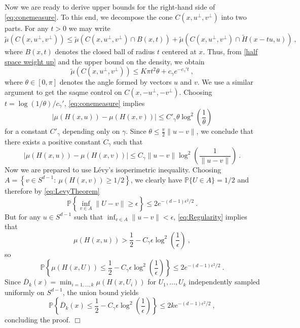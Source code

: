 \documentclass[12pt]{article}
\newcommand{\PP}{\mathbb{P}}
\newcommand{\wt}{\widetilde}
\newcommand{\ol}{\overline}
\newcommand{\field}[1]{\mathbb{#1}}
\newcommand{\PROB}{\field{P}}
\newcommand{\qed}{\hfill $\Box$}
\newenvironment{proof}{\par\noindent{\bf Proof:}}{\qed \par\medskip\noindent}
\begin{document}
\begin{proof}
Now we are ready to derive upper bounds for the right-hand side of \eqref{eq:conemeasure}.
To this end, we decompose the cone $C(x,u^{\perp},v^{\perp})$ into two
parts. For any $t>0$ we may write
\[
 \wt{\mu} \left(C(x,u^{\perp},v^{\perp})\right)
 \le \wt{\mu} \left(C(x,u^{\perp},v^{\perp}) \cap B(x,t)\right)
 + \wt{\mu} \left(C(x,u^{\perp},v^{\perp}) \cap \wt{H}(x-t u,u) \right)~,
\]
where $B(x,t)$ denotes the closed ball of radius $t$ centered at $x$.
Thus, from \eqref{half space weight up} and the upper bound on the
density, we obtain
\[
  \widetilde{\mu}\left( C(x,u^{\perp},v^{\perp})\right)  \leq
  K \pi t^2  \theta + c_{\gamma} e^{-c_{\gamma}'t}~,
\]
where $\theta \in [0,\pi]$ denotes the angle formed by vectors $u$ and $v$. We use a similar argument to get the saqme control on $C(x,-u^{\perp},-v^{\perp})$.
Choosing \linebreak $t=\log(1/\theta)/c_{\gamma}'$, \eqref{eq:conemeasure}
implies
\begin{equation*}
|\mu(H(x,u))-\mu(H(x,v))| \leq  C'_{\gamma}  \theta\log^2\left(\frac{1}{\theta}\right)
\end{equation*}
for a constant $C'_{\gamma}$ depending only on $\gamma$.
Since $\theta \leq \frac{\pi}{2}\|u-v\|$, we conclude that there exists a positive constant $C_{\gamma}$ such that
\begin{equation}\label{eq:Regularity}
|\mu(H(x,u))-\mu(H(x,v))| \leq  C_{\gamma} \|u-v\|\log^2\left(\frac{1}{\|u-v\|}\right)~.
\end{equation}
Now we are prepared to use Lévy's isoperimetric inequality. Choosing \linebreak
$A=\left\{v\in S^{d-1}: \ \mu(H(x,v))\geq 1/2 \right\}$, we clearly
have $\PROB\{U\in A\}= 1/2$ and therefore by \eqref{eq:LevyTheorem} 
\[
  \PROB\left\{ \inf_{v\in A} \|U-v\|\geq \epsilon \right\} \leq
  2e^{-(d-1)\epsilon^2/2}~.
\]
But for any $u\in S^{d-1}$ such that $\inf_{v\in A} \|u-v\| < \epsilon$,
\eqref{eq:Regularity} implies that
\[
  \mu(H(x,u)) >
  \frac{1}{2}-C_{\gamma}\epsilon\log^2\left(\frac{1}{\epsilon}\right)~,
\]
so
\[
  \PROB\left\{\mu(H(x,U))\leq
    \frac{1}{2}-C_{\gamma}\epsilon\log^2\left(\frac{1}{\epsilon}\right)
  \right\} \leq 2e^{-(d-1)\epsilon^2/2}~.
\]
Since $\ol{D}_k(x)=\min_{i=1,\dots, k}\mu(H(x,U_i))$ for $U_1,\ldots,U_k$ independently sampled uniformly on $S^{d-1}$, the union bound yields
\[
  \PP\left\{ \ol{D}_k(x) \leq
    \frac{1}{2}-C_{\gamma}\epsilon\log^2\left(
        \frac{1}{\epsilon}\right) \right\} \leq
  2ke^{-(d-1)\epsilon^2/2}~,
\]
concluding the proof.
\end{proof}
\end{document}
